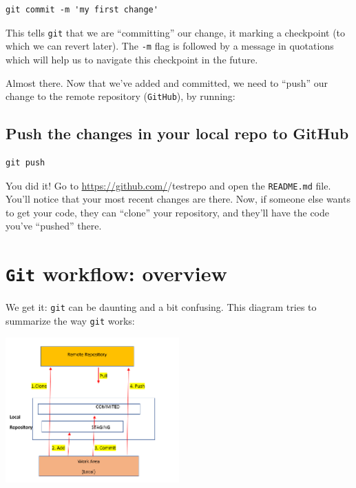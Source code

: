 \documentclass[]{book}
\begin{document}
\begin{verbatim}
git commit -m 'my first change'
\end{verbatim}

This tells \texttt{git} that we are ``committing'' our change, it marking a checkpoint (to which we can revert later). The \texttt{-m} flag is followed by a message in quotations which will help us to navigate this checkpoint in the future.

Almost there. Now that we've added and committed, we need to ``push'' our change to the remote repository (\texttt{GitHub}), by running:

\hypertarget{push-the-changes-in-your-local-repo-to-github}{%
\subsection*{Push the changes in your local repo to GitHub}\label{push-the-changes-in-your-local-repo-to-github}}

\begin{verbatim}
git push
\end{verbatim}

You did it! Go to \url{https://github.com/}/testrepo and open the \texttt{README.md} file. You'll notice that your most recent changes are there. Now, if someone else wants to get your code, they can ``clone'' your repository, and they'll have the code you've ``pushed'' there.

\hypertarget{git-workflow-overview}{%
\section*{\texorpdfstring{\texttt{Git} workflow: overview}{Git workflow: overview}}\label{git-workflow-overview}}

We get it: \texttt{git} can be daunting and a bit confusing. This diagram tries to summarize the way \texttt{git} works:

\includegraphics[width=0.5\textwidth,height=\textheight]{img/git-workflow.png}
\end{document}
